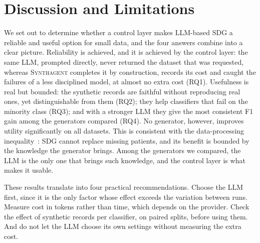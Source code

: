 \documentclass[conference]{IEEEtran}
\newcommand{\system}{\textsc{Synthagent}\xspace}
\begin{document}
\section{Discussion and Limitations}
\label{sec:discussion}
We set out to determine whether a control layer makes LLM-based SDG a reliable and useful option for small data, and the four answers combine into a clear picture. Reliability is achieved, and it is achieved by the control layer: the same LLM, prompted directly, never returned the dataset that was requested, whereas \system completes it by construction, records its cost and caught the failures of a less disciplined model, at almost no extra cost (RQ1). Usefulness is real but bounded: the synthetic records are faithful without reproducing real ones, yet distinguishable from them (RQ2); they help classifiers that fail on the minority class (RQ3); and with a stronger LLM they give the most consistent F1 gain among the generators compared (RQ4). No generator, however, improves utility significantly on all datasets. This is consistent with the data-processing inequality~\cite{cover2006elements}: SDG cannot replace missing patients, and its benefit is bounded by the knowledge the generator brings. Among the generators we compared, the LLM is the only one that brings such knowledge, and the control layer is what makes it usable.

These results translate into four practical recommendations. Choose the LLM first, since it is the only factor whose effect exceeds the variation between runs. Measure cost in tokens rather than time, which depends on the provider. Check the effect of synthetic records per classifier, on paired splits, before using them. And do not let the LLM choose its own settings without measuring the extra cost.
\end{document}
